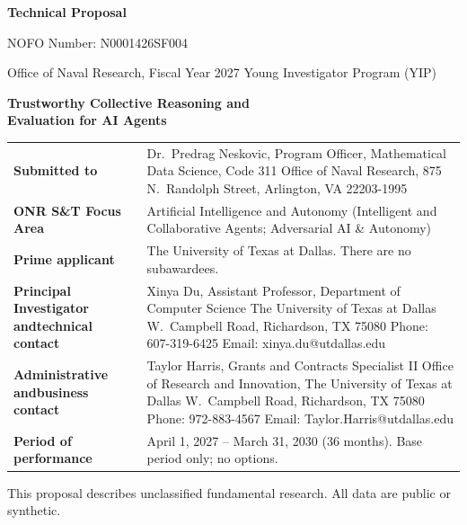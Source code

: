 \documentclass[12pt,letterpaper]{article}
\begin{document}
\thispagestyle{empty}
\begin{center}
{\Large\bfseries Technical Proposal\par}
\vspace{6pt}
NOFO Number: N0001426SF004\par
Office of Naval Research, Fiscal Year 2027 Young Investigator Program (YIP)\par
\vspace{26pt}
{\LARGE\bfseries Trustworthy Collective Reasoning and\\[4pt] Evaluation for AI Agents\par}
\vspace{26pt}
\end{center}
\renewcommand{\arraystretch}{1.15}
\begin{tabularx}{\textwidth}{@{}>{\bfseries}p{4.3cm}X@{}}
Submitted to & Dr.\ Predrag Neskovic, Program Officer, Mathematical Data Science, Code 311\newline
Office of Naval Research, 875 N.\ Randolph Street, Arlington, VA 22203-1995\\[6pt]
ONR S\&T Focus Area & Artificial Intelligence and Autonomy (Intelligent and Collaborative Agents; Adversarial AI \& Autonomy)\\[6pt]
Prime applicant & The University of Texas at Dallas. There are no subawardees.\\[6pt]
Principal Investigator and\newline technical contact & Xinya Du, Assistant Professor, Department of Computer Science\newline
The University of Texas at Dallas\newline
800 W.\ Campbell Road, Richardson, TX 75080\newline
Phone: 607-319-6425 \quad Email: xinya.du@utdallas.edu\\[6pt]
Administrative and\newline business contact & Taylor Harris, Grants and Contracts Specialist II\newline
Office of Research and Innovation, The University of Texas at Dallas\newline
800 W.\ Campbell Road, Richardson, TX 75080\newline
Phone: 972-883-4567 \quad Email: Taylor.Harris@utdallas.edu\\[6pt]
Period of performance & April 1, 2027 -- March 31, 2030 (36 months). Base period only; no options.\\
\end{tabularx}
\vfill
\begin{center}\small
This proposal describes unclassified fundamental research. All data are public or synthetic.
\end{center}
\clearpage
\end{document}
